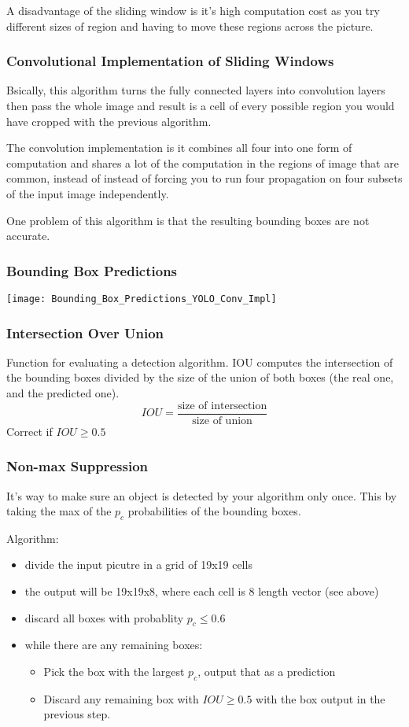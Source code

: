 A disadvantage of the sliding window is it's high computation cost as you try different sizes of region and having to move these regions across the picture.

\subsubsection{Convolutional Implementation of Sliding Windows}
Bsically, this algorithm turns the fully connected layers into convolution layers then pass the whole image and result is a cell of every possible region you would have cropped with the previous algorithm.

The convolution implementation is it combines all four into one form of computation and shares a lot of the computation in the regions of image that are common, instead of instead of forcing you to run four propagation on four subsets of the input image independently.

One problem of this algorithm is that the resulting bounding boxes are not accurate.

\subsubsection{Bounding Box Predictions}
\texttt{[image: Bounding\_Box\_Predictions\_YOLO\_Conv\_Impl]}

\subsubsection{Intersection Over Union}
Function for evaluating a detection algorithm. IOU computes the intersection of the bounding boxes divided by the size of the union of both boxes (the real one, and the predicted one).
\begin{equation*}
    IOU = \frac{\text{size of intersection}}{\text{size of union}}
\end{equation*}
Correct if $IOU \ge 0.5$

\subsubsection{Non-max Suppression}
It's way to make sure an object is detected by your algorithm only once. This by taking the max of the $p_c$ probabilities of the bounding boxes.

Algorithm:
\begin{itemize}
    \item divide the input picutre in a grid of 19x19 cells
    \item the output will be 19x19x8, where each cell is 8 length vector (see above)
    \item discard all boxes with probablity $p_c \leq 0.6$
    \item while there are any remaining boxes:
    \begin{itemize}
        \item Pick the box with the largest $p_c$, output that as a prediction
        \item Discard any remaining box with $IOU \ge 0.5$ with the box output in the previous step.
    \end{itemize}
\end{itemize}

